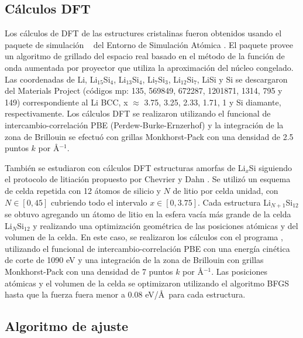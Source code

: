 \subsection{Cálculos DFT}\label{s:dftcalc}

Los cálculos de DFT de las estructures cristalinas fueron obtenidos usando el 
paquete de simulación  ~\cite{enkovaara2010, mortensen2005} del 
Entorno de Simulación Atómica \cite{larsen2017}. El paquete  provee un 
algoritmo de grillado del espacio real basado en el método de la función de onda 
aumentada por proyector \cite{blochl1994} que utiliza la aproximación del núcleo 
congelado. Las coordenadas de Li, Li$_{15}$Si$_{4}$, Li$_{13}$Si$_{4}$, 
Li$_{7}$Si$_{3}$, Li$_{12}$Si$_{7}$, LiSi y Si se descargaron del Materials 
Project \cite{materials_project} (códigos mp: 135, 569849, 672287, 1201871, 1314, 
795 y 149) correspondiente al Li BCC, x $\approx$ 3.75, 3.25, 2.33, 1.71, 1 y
Si diamante, respectivamente. Los cálculos DFT se realizaron utilizando el 
funcional de intercambio-correlación PBE (Perdew-Burke-Ernzerhof) y la integración
de la zona de Brillouin se efectuó con grillas Monkhorst-Pack con una densidad
de 2.5 puntos $k$ por \AA$^{-1}$.

También se estudiaron con cálculos DFT estructuras amorfas de Li$_x$Si siguiendo
el protocolo de litiación propuesto por Chevrier y Dahn \cite{chevrier2009, 
chevrier2010}. Se utilizó un esquema de celda repetida con 12 átomos de silicio y 
$N$ de litio por celda unidad, con $N\in[0,45]$ cubriendo todo el intervalo 
$x\in[0,3.75]$. Cada estructura Li$_{N+1}$Si$_{12}$ se obtuvo agregando un átomo 
de litio en la esfera vacía más grande de la celda Li$_{N}$Si$_{12}$ y realizando
una optimización geométrica de las posiciones atómicas y del volumen de la celda.
En este caso, se realizaron los cálculos con el programa  
 \cite{quantum_espresso,quantum_espresso_advanced}, utilizando el 
funcional de intercambio-correlación PBE con una energía cinética de corte de 
1090 eV y una integración de la zona de Brillouin con grillas Monkhorst-Pack con 
una densidad de 7 puntos $k$ por \AA$^{-1}$. Las posiciones atómicas y el volumen 
de la celda se optimizaron utilizando el algoritmo BFGS hasta que la fuerza fuera 
menor a 0.08 eV/\AA\ para cada estructura.


\subsection{Algoritmo de ajuste}\label{s:algfit}

